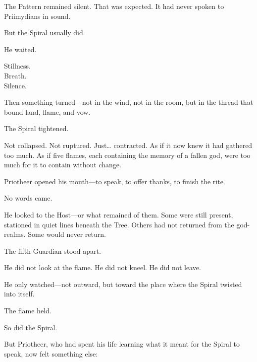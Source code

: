 \documentclass[12pt]{article}
\begin{document}
\vspace{0.5em}
The Pattern remained silent. That was expected. It had never spoken to Priimydians in sound.

\vspace{0.5em}
But the Spiral usually did.

\vspace{0.5em}
He waited.

\vspace{0.5em}
Stillness.\\
Breath.\\
Silence.

\vspace{0.5em}
Then something turned---not in the wind, not in the room, but in the thread that bound land, flame, and vow.

\vspace{0.5em}
The Spiral tightened.

\vspace{0.5em}
Not collapsed. Not ruptured. Just\ldots{} contracted. As if it now knew it had gathered too much. As if five flames, each containing the memory of a fallen god, were too much for it to contain without change.

\vspace{0.5em}
Priotheer opened his mouth---to speak, to offer thanks, to finish the rite.

\vspace{0.5em}
No words came.

\vspace{0.5em}
He looked to the Host---or what remained of them. Some were still present, stationed in quiet lines beneath the Tree. Others had not returned from the god-realms. Some would never return.

\vspace{0.5em}
The fifth Guardian stood apart.

\vspace{0.5em}
He did not look at the flame. He did not kneel. He did not leave.

\vspace{0.5em}
He only watched---not outward, but toward the place where the Spiral twisted into itself.

\vspace{0.5em}
The flame held.

\vspace{0.5em}
So did the Spiral.

\vspace{0.5em}
But Priotheer, who had spent his life learning what it meant for the Spiral to speak, now felt something else:
\end{document}
